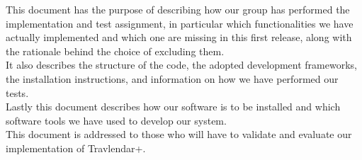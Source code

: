 This document has the purpose of describing how our group has performed the implementation and test assignment, in particular which functionalities we have actually implemented and which one are missing in this first release, along with the rationale behind the choice of excluding them. \\ It also describes the structure of the code, the adopted development frameworks, the installation instructions, and information on how we have performed our tests. \\ Lastly this document describes how our software is to be installed and which software tools we have used to develop our system.\\
This document is addressed to those who will have to validate and evaluate our implementation of Travlendar+.